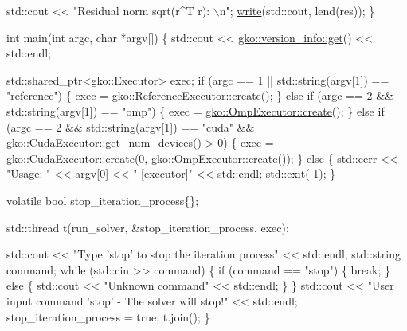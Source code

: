 \begin{DoxyCodeInclude}
    std::cout << \textcolor{stringliteral}{"Residual norm sqrt(r^T r): \(\backslash\)n"};
    \hyperlink{namespacegko_a859dc47a462721d83728d91ab7fa2148}{write}(std::cout, lend(res));
\}


\textcolor{keywordtype}{int} main(\textcolor{keywordtype}{int} argc, \textcolor{keywordtype}{char} *argv[])
\{
    std::cout << \hyperlink{classgko_1_1version__info_a6daeb8a087cfb57fa055526fc133d8eb}{gko::version\_info::get}() << std::endl;

    std::shared\_ptr<gko::Executor> exec;
    \textcolor{keywordflow}{if} (argc == 1 || std::string(argv[1]) == \textcolor{stringliteral}{"reference"}) \{
        exec = gko::ReferenceExecutor::create();
    \} \textcolor{keywordflow}{else} \textcolor{keywordflow}{if} (argc == 2 && std::string(argv[1]) == \textcolor{stringliteral}{"omp"}) \{
        exec = \hyperlink{classgko_1_1OmpExecutor_a33ca05fdd0fc928ee262fc9425304874}{gko::OmpExecutor::create}();
    \} \textcolor{keywordflow}{else} \textcolor{keywordflow}{if} (argc == 2 && std::string(argv[1]) == \textcolor{stringliteral}{"cuda"} &&
               \hyperlink{classgko_1_1CudaExecutor_aef0258494d14de0e56149b920c5173e5}{gko::CudaExecutor::get\_num\_devices}() > 0) \{
        exec = \hyperlink{classgko_1_1CudaExecutor_a2718a92034350650ef406ffdb60db090}{gko::CudaExecutor::create}(0, 
      \hyperlink{classgko_1_1OmpExecutor_a33ca05fdd0fc928ee262fc9425304874}{gko::OmpExecutor::create}());
    \} \textcolor{keywordflow}{else} \{
        std::cerr << \textcolor{stringliteral}{"Usage: "} << argv[0] << \textcolor{stringliteral}{" [executor]"} << std::endl;
        std::exit(-1);
    \}

    \textcolor{keyword}{volatile} \textcolor{keywordtype}{bool} stop\_iteration\_process\{\};

    std::thread t(run\_solver, &stop\_iteration\_process, exec);

    std::cout << \textcolor{stringliteral}{"Type 'stop' to stop the iteration process"} << std::endl;
    std::string command;
    \textcolor{keywordflow}{while} (std::cin >> command) \{
        \textcolor{keywordflow}{if} (command == \textcolor{stringliteral}{"stop"}) \{
            \textcolor{keywordflow}{break};
        \} \textcolor{keywordflow}{else} \{
            std::cout << \textcolor{stringliteral}{"Unknown command"} << std::endl;
        \}
    \}
    std::cout << \textcolor{stringliteral}{"User input command 'stop' - The solver will stop!"}
              << std::endl;
    stop\_iteration\_process = \textcolor{keyword}{true};
    t.join();
\}
\end{DoxyCodeInclude}
 